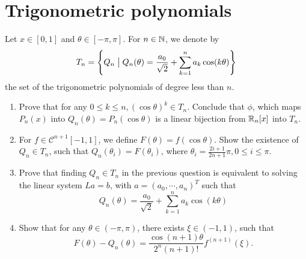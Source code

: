 \section{Trigonometric polynomials}
Let \(x\in[0,1]\) and \(\theta\in[-\pi,\pi]\).
For \(n\in\mathbb{N}\), we denote by
\[T_n=\Sets{Q_n}{Q_n(\theta)=\frac{a_0}{\sqrt{2}}+\sum_{k=1}^n a_k\cos(k\theta)} \]
the set of the trigonometric  polynomials of degree less than $n$.
\begin{enumerate}
	\item Prove that for any \(0\leq k\leq n, (\cos\theta)^k\in T_n\).
	Conclude that $\phi$, which maps \(P_n(x)\) into \(Q_n(\theta)=P_n(\cos\theta)\) is a linear bijection from \(\mathbb{R}_n[x]\) into $T_n$.
	\item For \(f\in\mathcal{C}^{n+1}[−1,1]\), we define \(F(\theta)=f(\cos\theta)\).
	Show the existence of \(Q_n\in T_n\), such that \(Q_n(\theta_i)=F(\theta_i)\), where \(\theta_i=\frac{2i+1}{2n+1}\pi,0\leq i\leq\pi\).
	\item Prove that finding \(Q_n\in T_n\) in the previous question is equivalent to solving the linear system \(La=b\), with \(a=(a_0,\cdots,a_n)^T\) such that
	\[ Q_n(\theta)=\frac{a_0}{\sqrt{2}}+\sum_{k=1}^n a_k\cos(k\theta) \]
	\item Show that for any \(\theta\in(-\pi,\pi)\), there exists \(\xi\in(-1,1)\), such that
	\[ F(\theta)-Q_n(\theta)=\frac{\cos(n+1)\theta}{2^n(n+1)!}f^{(n+1)}(\xi). \]
\end{enumerate}
